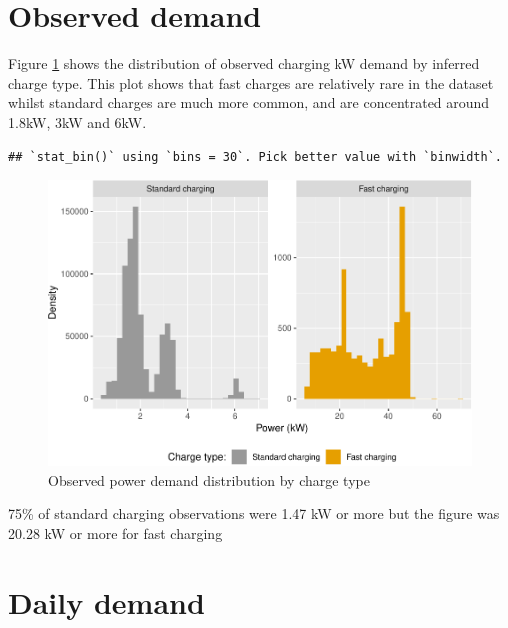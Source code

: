 \documentclass[]{article}
\begin{document}
\section{Observed demand}\label{observed-demand}

Figure \ref{fig:obsPower} shows the distribution of observed charging kW
demand by inferred charge type. This plot shows that fast charges are
relatively rare in the dataset whilst standard charges are much more
common, and are concentrated around 1.8kW, 3kW and 6kW.

\begin{verbatim}
## `stat_bin()` using `bins = 30`. Pick better value with `binwidth`.
\end{verbatim}

\begin{figure}
\centering
\includegraphics{EVBB_SummaryReport_files/figure-latex/obsPower-1.pdf}
\caption{\label{fig:obsPower}Observed power demand distribution by charge
type}
\end{figure}

75\% of standard charging observations were 1.47 kW or more but the
figure was 20.28 kW or more for fast charging

\section{Daily demand}\label{daily-demand}
\end{document}
